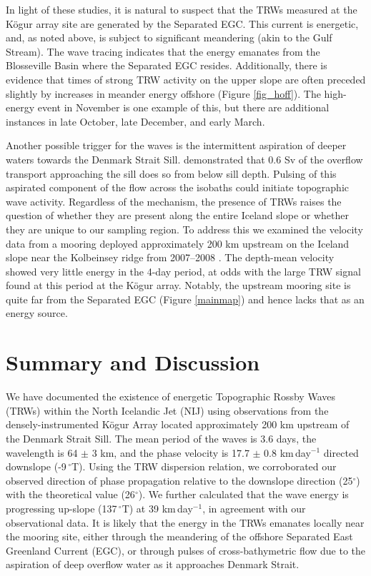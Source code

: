 \documentclass[12pt,titlepage,figuresatend]{article}
\begin{document}
In light of these studies, it is natural to suspect that the TRWs measured at the K\"{o}gur array site are generated by the Separated EGC. This current is energetic, and, as noted above, is subject to significant meandering (akin to the Gulf Stream). The wave tracing indicates that the energy emanates from the Blosseville Basin where the Separated EGC resides. Additionally, there is evidence that times of strong TRW activity on the upper slope are often preceded slightly by increases in meander energy offshore (Figure \ref{fig_hoff}). The high-energy event in November is one example of this, but there are additional instances in late October, late December, and early March. 

Another possible trigger for the waves is the intermittent aspiration of deeper waters towards the Denmark Strait Sill. \cite{Harden2016} demonstrated that 0.6 Sv of the overflow transport approaching the sill does so from below sill depth. Pulsing of this aspirated component of the flow across the isobaths could initiate topographic wave activity. Regardless of the mechanism, the presence of TRWs raises the question of whether they are present along the entire Iceland slope or whether they are unique to our sampling region. To address this we examined the velocity data from a mooring deployed approximately 200 km upstream on the Iceland slope near the Kolbeinsey ridge from 2007--2008 \cite[]{Jonsson2012}. The depth-mean velocity showed very little energy in the 4-day period, at odds with the large TRW signal found at this period at the K\"{o}gur array. Notably, the upstream mooring site is quite far from the Separated EGC (Figure \ref{mainmap}) and hence lacks that as an energy source. 


\section{Summary and Discussion}

We have documented the existence of energetic Topographic Rossby Waves (TRWs) within the North Icelandic Jet (NIJ) using observations from the densely-instrumented K\"{o}gur Array located approximately 200 km upstream of the Denmark Strait Sill. The mean period of the waves is 3.6 days, the wavelength is 64 $\pm$ 3 km, and the phase velocity is 17.7 $\pm$ 0.8 km$\,$day$^{-1}$ directed downslope (-9$\,^{\circ}$T). Using the TRW dispersion relation, we corroborated our observed direction of phase propagation relative to the downslope direction (25$^{\circ}$) with the theoretical value (26$^{\circ}$). We further calculated that the wave energy is progressing up-slope (137$\,^{\circ}$T) at 39 km$\,$day$^{-1}$, in agreement with our observational data. It is likely that the energy in the TRWs emanates locally near the mooring site, either through the meandering of the offshore Separated East Greenland Current (EGC), or through pulses of cross-bathymetric flow due to the aspiration of deep overflow water as it approaches Denmark Strait. 
\end{document}
